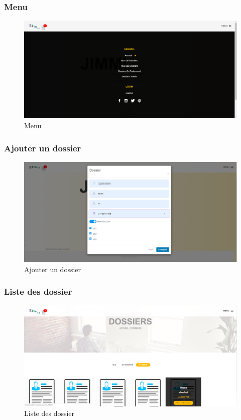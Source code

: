 \subsubsection{ Menu  } 
\begin{figure}[H]
	\centering
	\includegraphics[width=1\linewidth]{images/captures/capturesuser/menu}
	\caption{Menu}
	\label{fig:menu}
\end{figure}





\subsubsection{Ajouter un dossier}
 
\begin{figure}[H]
	\centering
	\includegraphics[width=1\linewidth]{images/captures/capturesuser/adddossier}
	\caption{Ajouter un dossier}
	\label{fig:adddossier}
\end{figure}



\subsubsection{ Liste des dossier }

\begin{figure}[H]
	\centering
	\includegraphics[width=1\linewidth]{images/captures/capturesuser/dossier}
	\caption{Liste des dossier}
	\label{fig:udossier}
\end{figure}





 





